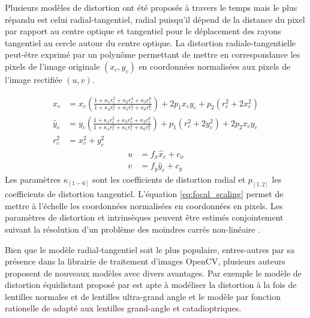 Plusieurs modèles de distortion ont été proposés à travers le temps mais le plus répandu est celui radial-tangentiel, radial puisqu'il dépend de la distance du pixel par rapport au centre optique et tangentiel pour le déplacement des rayons tangentiel au cercle autour du centre optique. La distortion radiale-tangentielle peut-être exprimé par un polynôme permettant de mettre en correspondance les pixels de l'image originale $(x_c, y_c)$ en coordonnées normalisées aux pixels de l'image rectifiée $(u, v)$.

\begin{equation}
\begin{aligned}
  \hat{x}_c &= x_c\left(\frac{1 + \kappa_1r_c^2 + \kappa_2r_c^4 + \kappa_3r_c^6}{1 + \kappa_4r_c^2 + \kappa_5r_c^4 + \kappa_6r_c^6}\right) + 2p_1 x_c y_c + p_2(r_c^2 + 2 x_c^2) \\
  \hat{y}_c &= y_c\left(\frac{1 + \kappa_1r_c^2 + \kappa_2r_c^4 + \kappa_3r_c^6}{1 + \kappa_4r_c^2 + \kappa_5r_c^4 + \kappa_6r_c^6}\right) + p_1 (r_c^2 + 2 y_c^2) + 2p_2 x_c y_c \\
  r_c^2     &= x_c^2 + y_c^2
  \label{eq:rectification}
\end{aligned}
\end{equation}
\begin{equation}
\begin{aligned}
  u & = f_x \hat{x}_c + c_x\\
  v &= f_y \hat{y}_c + c_y
  \label{eq:focal_scaling}
\end{aligned}
\end{equation}
Les paramètres $\kappa_{[1-6]}$ sont les coefficients de distortion radial et $p_{[1,2]}$ les coefficients de distortion tangentiel. L'équation \ref{eq:focal_scaling} permet de mettre à l'échelle les coordonnées normalisées en coordonnées en pixels. Les paramètres de distortion et intrinsèques peuvent être estimés conjointement suivant la résolution d'un problème des moindres carrés non-linéaire \citep{Zhang2000}.

Bien que le modèle radial-tangentiel soit le plus populaire, entres-autres par sa présence dans la librairie de traitement d'images OpenCV, plusieurs auteurs proposent de nouveaux modèles avec divers avantages. Par exemple le modèle de distortion équidistant proposé par \cite{Kannala2006} est apte à modéliser la distortion à la fois de lentilles normales et de lentilles ultra-grand angle et le modèle par fonction rationelle de \cite{Claus2005} adapté aux lentilles grand-angle et catadioptriques.

